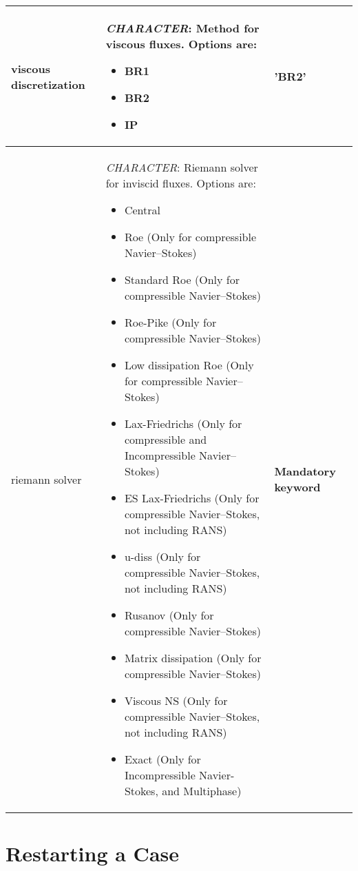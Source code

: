 \documentclass[a4paper,10pt]{report}
\begin{document}
\begin{longtable}{|p{4cm}|p{10cm}|p{2.2cm}|}
viscous discretization & \textit{CHARACTER}: Method for viscous fluxes. Options are:
    \begin{itemize}
    \item BR1
    \item BR2
    \item IP
    \end{itemize} 
                    & 'BR2' \\ \hline

riemann solver      & \textit{CHARACTER}: Riemann solver for inviscid fluxes. Options are:
    \begin{itemize}
    \item Central
    \item Roe (Only for compressible Navier–Stokes)
    \item Standard Roe (Only for compressible Navier–Stokes)
    \item Roe-Pike (Only for compressible Navier–Stokes)
    \item Low dissipation Roe (Only for compressible Navier–Stokes)
    \item Lax-Friedrichs (Only for compressible and Incompressible Navier–Stokes)
    \item ES Lax-Friedrichs (Only for compressible Navier–Stokes, not including RANS)
    \item u-diss (Only for compressible Navier–Stokes, not including RANS)
    \item Rusanov (Only for compressible Navier–Stokes)
    \item Matrix dissipation (Only for compressible Navier–Stokes)
    \item Viscous NS (Only for compressible Navier–Stokes, not including RANS)
    \item Exact (Only for Incompressible Navier-Stokes, and Multiphase)
    \end{itemize} 
                    & \textbf{Mandatory keyword} \\ \hline

\end{longtable}


\chapter{Restarting a Case}
\end{document}
